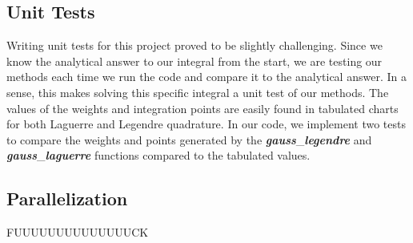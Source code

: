 \documentclass{emulateapj}
\begin{document}
\subsection{Unit Tests}
Writing unit tests for this project proved to be slightly challenging. Since we know  the analytical answer to our integral from the start, we are testing our methods each time we run the code and compare it to the analytical answer. In a sense, this makes solving this specific integral a unit test of our methods. The values of the weights and integration points are easily found in tabulated charts for both Laguerre and Legendre quadrature. In our code, we implement two tests to compare the weights and points generated by the \textbf{\textit{gauss}}\_\textbf{\textit{legendre}} and \textbf{\textit{gauss}}\_\textbf{\textit{laguerre}} functions compared to the tabulated values.
\subsection{Parallelization}
FUUUUUUUUUUUUUUCK
\end{document}

